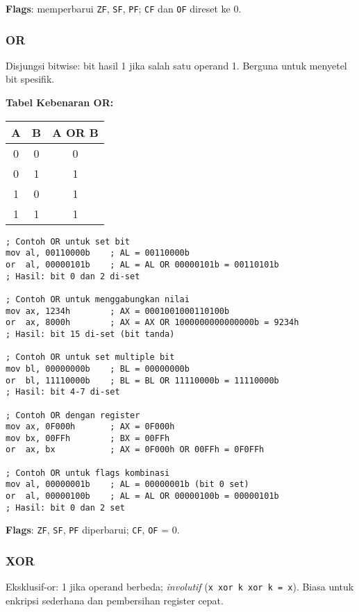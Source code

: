 \documentclass[../main.tex]{subfiles}
\begin{document}
\textbf{Flags}: memperbarui \texttt{ZF}, \texttt{SF}, \texttt{PF}; \texttt{CF} dan \texttt{OF} direset ke 0.

            \subsubsection{OR}
Disjungsi bitwise: bit hasil 1 jika salah satu operand 1. Berguna untuk menyetel bit spesifik.

\textbf{Tabel Kebenaran OR:}
\begin{center}
    \begin{tabular}{|c|c|c|}
        \hline
        A & B & A OR B \\
        \hline
        0 & 0 & 0 \\
        0 & 1 & 1 \\
        1 & 0 & 1 \\
        1 & 1 & 1 \\
        \hline
    \end{tabular}
\end{center}

\begin{lstlisting}[language={[x86masm]Assembler}, caption=Instruksi OR, label={lst:or-examples}]
; Contoh OR untuk set bit
mov al, 00110000b    ; AL = 00110000b
or  al, 00000101b    ; AL = AL OR 00000101b = 00110101b
; Hasil: bit 0 dan 2 di-set

; Contoh OR untuk menggabungkan nilai
mov ax, 1234h        ; AX = 0001001000110100b
or  ax, 8000h        ; AX = AX OR 1000000000000000b = 9234h
; Hasil: bit 15 di-set (bit tanda)

; Contoh OR untuk set multiple bit
mov bl, 00000000b    ; BL = 00000000b
or  bl, 11110000b    ; BL = BL OR 11110000b = 11110000b
; Hasil: bit 4-7 di-set

; Contoh OR dengan register
mov ax, 0F000h       ; AX = 0F000h
mov bx, 00FFh        ; BX = 00FFh
or  ax, bx           ; AX = 0F000h OR 00FFh = 0F0FFh

; Contoh OR untuk flags kombinasi
mov al, 00000001b    ; AL = 00000001b (bit 0 set)
or  al, 00000100b    ; AL = AL OR 00000100b = 00000101b
; Hasil: bit 0 dan 2 set
\end{lstlisting}

\textbf{Flags}: \texttt{ZF}, \texttt{SF}, \texttt{PF} diperbarui; \texttt{CF}, \texttt{OF} = 0.

            \subsubsection{XOR}
Eksklusif-or: 1 jika operand berbeda; \textit{involutif} (\texttt{x xor k xor k = x}). Biasa untuk enkripsi sederhana dan pembersihan register cepat.
\end{document}
